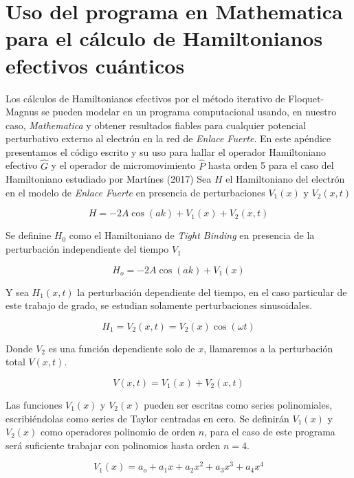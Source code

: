 \chapter{Uso del programa en Mathematica para el cálculo de Hamiltonianos efectivos cuánticos}

Los cálculos de Hamiltonianos efectivos por el método iterativo de Floquet-Magnus se pueden modelar en un programa computacional usando, en nuestro caso, \textit{Mathematica} y obtener resultados fiables para cualquier potencial perturbativo externo al electrón en la red de \textit{Enlace Fuerte}. En este apéndice presentamos el código escrito y su uso para hallar el operador Hamiltoniano efectivo  $\hat{G}$ y el operador de micromovimiento $\hat{P}$ hasta orden 5 para el caso del Hamiltoniano estudiado por Martínes (2017) \cite{martinez2017}
Sea $H$ el Hamiltoniano del electrón en el modelo de \textit{Enlace Fuerte} en presencia de perturbaciones $V_1(x)$ y $V_2(x,t)$

\begin{equation}
    H=-2A\cos(ak)+V_1(x)+V_2(x,t)
\end{equation}

Se definine $H_0$ como el Hamiltoniano de \textit{Tight Binding} en presencia de la perturbación independiente del tiempo $V_1$

\begin{equation}
    H_o=-2A\cos(ak)+ V_1(x)
\end{equation}

Y sea $H_1(x,t)$ la perturbación dependiente del tiempo, en el caso particular de este trabajo de grado, se estudian solamente perturbaciones sinusoidales.

\begin{equation}
    H_1= V_2(x,t)=V_2(x)\cos(\omega t)
\end{equation}
 
Donde $V_2$ es una función dependiente solo de $x$, llamaremos a la perturbación total $V(x,t)$.

\begin{equation}
    V(x,t)=V_1(x)+V_2(x,t)
\end{equation}

Las funciones $V_1(x)$ y $V_2(x)$ pueden ser escritas como series polinomiales, escribiéndolas como series de Taylor centradas en cero. Se definirán $V_1(x)$ y $V_2(x)$ como operadores polinomio de orden $n$, para el caso de este programa será suficiente trabajar con polinomios hasta orden $n=4$.

\begin{equation}
    V_1(x) = a_o + a_1x + a_2x^2 + a_3x^3 + a_4x^4
\end{equation}

